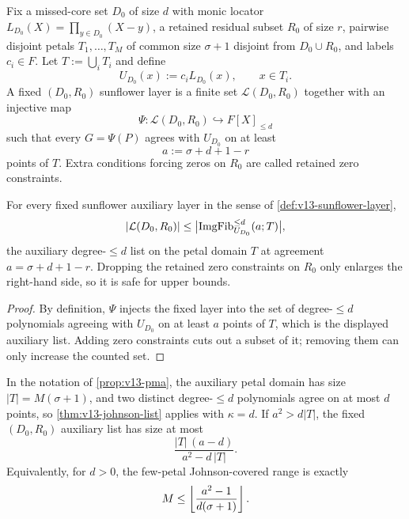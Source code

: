 \begin{definition}\label{def:v13-sunflower-layer}
Fix a missed-core set $D_0$ of size $d$ with monic locator $L_{D_0}(X)=\prod_{y\in D_0}(X-y)$, a retained residual subset $R_0$ of size $r$, pairwise disjoint petals $T_1,\ldots,T_M$ of common size $\sigma+1$ disjoint from $D_0\cup R_0$, and labels $c_i\in F$.  Let $T:=\bigcup_iT_i$ and define
\[
        U_{D_0}(x):=c_iL_{D_0}(x),\qquad x\in T_i.
\]
A fixed $(D_0,R_0)$ sunflower layer is a finite set $\mathcal L(D_0,R_0)$ together with an injective map
\[
        \Psi:\mathcal L(D_0,R_0)\hookrightarrow F[X]_{\le d}
\]
such that every $G=\Psi(P)$ agrees with $U_{D_0}$ on at least
\[
        a:=\sigma+d+1-r
\]
points of $T$.  Extra conditions forcing zeros on $R_0$ are called retained zero constraints.
\end{definition}

\begin{proposition}\label{prop:v13-pma}
For every fixed sunflower auxiliary layer in the sense of \cref{def:v13-sunflower-layer},
\[
        |\mathcal L(D_0,R_0)|
        \le
        \bigl|\operatorname{ImgFib}_{U_{D_0}}^{\le d}(a;T)\bigr|,
\]
the auxiliary degree-$\le d$ list on the petal domain $T$ at agreement $a=\sigma+d+1-r$.  Dropping the retained zero constraints on $R_0$ only enlarges the right-hand side, so it is safe for upper bounds.
\end{proposition}

\begin{proof}
By definition, $\Psi$ injects the fixed layer into the set of degree-$\le d$ polynomials agreeing with $U_{D_0}$ on at least $a$ points of $T$, which is the displayed auxiliary list.  Adding zero constraints cuts out a subset of it; removing them can only increase the counted set.
\end{proof}

\begin{corollary}\label{cor:v13-pma-johnson}
In the notation of \cref{prop:v13-pma}, the auxiliary petal domain has size $|T|=M(\sigma+1)$, and two distinct degree-$\le d$ polynomials agree on at most $d$ points, so \cref{thm:v13-johnson-list} applies with $\kappa=d$.  If $a^2>d|T|$, the fixed $(D_0,R_0)$ auxiliary list has size at most
\[
        \frac{|T|\,(a-d)}{a^2-d\,|T|}.
\]
Equivalently, for $d>0$, the few-petal Johnson-covered range is exactly
\[
        M\le
        \left\lfloor \frac{a^2-1}{d(\sigma+1)}\right\rfloor.
\]
\end{corollary}

